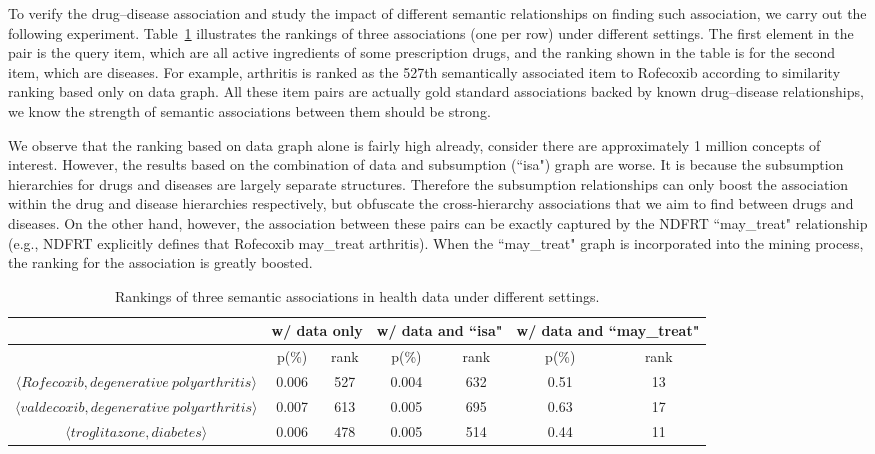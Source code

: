To verify the drug--disease association and study the impact of different semantic relationships on finding such association, we carry out the following experiment. Table~\ref{tbl:health_exp} illustrates the rankings of three associations (one per row) under different settings. The first element in the pair is the query item, which are all active ingredients of some prescription drugs, and the ranking shown in the table is for the second item, which are diseases. For example, arthritis is ranked as the 527th semantically associated item to Rofecoxib according to similarity ranking based only on data graph. All these item pairs are actually gold standard associations backed by known drug--disease relationships, we know the strength of semantic associations between them should be strong.

We observe that the ranking based on data graph alone is fairly high already, consider there are approximately 1 million concepts of interest. However, the results based on the combination of data and subsumption (``isa") graph are worse. It is because the subsumption hierarchies for drugs and diseases are largely separate structures. Therefore the subsumption relationships can only boost the association within the drug and disease hierarchies respectively, but obfuscate the cross-hierarchy associations that we aim to find between drugs and diseases. On the other hand, however, the association between these pairs can be exactly captured by the NDFRT ``may\_treat" relationship (e.g., NDFRT explicitly defines that Rofecoxib may\_treat arthritis). When the ``may\_treat" graph is incorporated into the mining process, the ranking for the association is greatly boosted.

\begin{table}[tbh]\scriptsize
\begin{center}
\begin{tabular}{ c || c  c || c  c || c  c }
\hline
        &   \multicolumn{2}{c||}{w/ data only}  &   \multicolumn{2}{c||}{w/ data and ``isa"} & \multicolumn{2}{c}{w/ data and ``may\_treat"}\\
\hline
\hline
                        	&   p(\%)   &   rank    &   p(\%)    &   rank    &   p(\%)    &    rank    \\
\hline
$\langle Rofecoxib, degenerative~polyarthritis\rangle$  &   0.006   &   527     &   0.004    &   632     &   0.51     &     13     \\
$\langle valdecoxib, degenerative~polyarthritis\rangle$  &   0.007   &   613     &   0.005    &   695     &   0.63     &     17     \\
$\langle troglitazone, diabetes\rangle$  &   0.006   &   478     &   0.005    &   514     &   0.44     &     11     \\
\hline
\end{tabular}
\end{center}
\caption[Rankings of three semantic associations in health data under\protect\newline different settings]{\label{tbl:health_exp}Rankings of three semantic associations in health data under different settings.}
\end{table}






